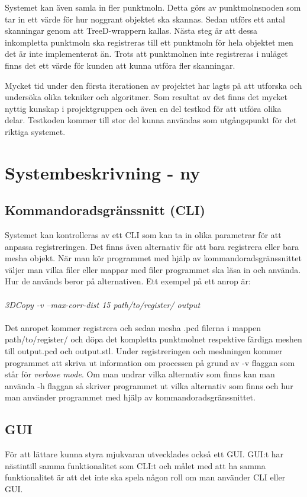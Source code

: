 Systemet kan även samla in fler punktmoln. Detta görs av punktmolnsnoden som tar in ett värde för hur noggrant objektet ska skannas. Sedan utförs ett antal skanningar genom att TreeD-wrappern kallas. Nästa steg är att dessa inkompletta punktmoln ska registreras till ett punktmoln för hela objektet men det är inte implementerat än. Trots att punktmolnen inte registreras i nuläget finns det ett värde för kunden att kunna utföra fler skanningar.

Mycket tid under den första iterationen av projektet har lagts på att utforska och undersöka olika tekniker och algoritmer. Som resultat av det finns det mycket nyttig kunskap i projektgruppen och även en del testkod för att utföra olika delar. Testkoden kommer till stor del kunna användas som utgångspunkt för det riktiga systemet.

\section{Systembeskrivning - ny}
\subsection{Kommandoradsgränssnitt (CLI)}

Systemet kan kontrolleras av ett CLI som kan ta in olika parametrar för att anpassa registreringen. Det finns även alternativ för att bara registrera eller bara mesha objekt. När man kör programmet med hjälp av kommandoradsgränssnittet väljer man vilka filer eller mappar med filer programmet ska läsa in och använda. Hur de används beror på alternativen. Ett exempel på ett anrop är:\\\\
\textit{3DCopy -v --max-corr-dist 15 path/to/register/ output}\\\\
Det anropet kommer registrera och sedan mesha .pcd filerna i mappen path/to/register/ och döpa det kompletta punktmolnet respektive färdiga meshen till output.pcd och output.stl. Under registreringen och meshningen kommer programmet att skriva ut information om processen på grund av -v flaggan som står för \textit{verbose mode}. Om man undrar vilka alternativ som finns kan man använda -h flaggan så skriver programmet ut vilka alternativ som finns och hur man använder programmet med hjälp av kommandoradsgränssnittet. 

\subsection{GUI}
För att lättare kunna styra mjukvaran utvecklades också ett GUI. GUI:t har nästintill samma funktionalitet som CLI:t och målet med att ha samma funktionalitet är att det inte ska spela någon roll om man använder CLI eller GUI.

